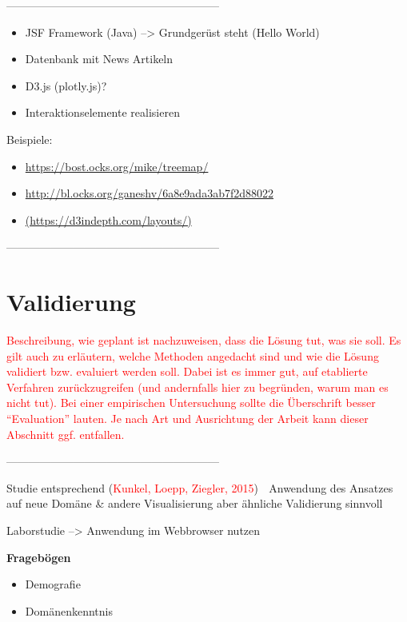 \documentclass[ngerman, a4paper, abstract=false, twoside=false, parskip=half, DIV=12, bibtotoc]{scrartcl}
\begin{document}
---------------------------------------------------------
\begin{itemize}
\item JSF Framework (Java) --> Grundgerüst steht (Hello World)
\item Datenbank mit News Artikeln
\item D3.js (plotly.js)?
\item Interaktionselemente realisieren
\end{itemize}


Beispiele:

\begin{itemize}
\item \href{https://bost.ocks.org/mike/treemap/}{https://bost.ocks.org/mike/treemap/}
\item \href{http://bl.ocks.org/ganeshv/6a8e9ada3ab7f2d88022}{http://bl.ocks.org/ganeshv/6a8e9ada3ab7f2d88022}
\item \href{https://d3indepth.com/layouts/}{(https://d3indepth.com/layouts/)}
\end{itemize}


---------------------------------------------------------

\section{Validierung}
\textcolor{red}{Beschreibung, wie geplant ist nachzuweisen, dass die Lösung tut, was sie soll. Es gilt auch zu erläutern, welche Methoden angedacht sind und wie die Lösung validiert bzw. evaluiert werden soll. Dabei ist es immer gut, auf etablierte Verfahren zurückzugreifen (und andernfalls hier zu begründen, warum man es nicht tut). Bei einer empirischen Untersuchung sollte die Überschrift besser \enquote{Evaluation} lauten. Je nach Art und Ausrichtung der Arbeit kann dieser Abschnitt ggf. entfallen.}

---------------------------------------------------------

Studie entsprechend (\textcolor{red}{Kunkel, Loepp, Ziegler, 2015})  Anwendung des Ansatzes auf neue Domäne & andere Visualisierung aber ähnliche Validierung sinnvoll

Laborstudie -->  Anwendung im Webbrowser nutzen

\textbf{Fragebögen}

\begin{itemize}
\item Demografie
\item Domänenkenntnis
\end{itemize}
\end{document}
